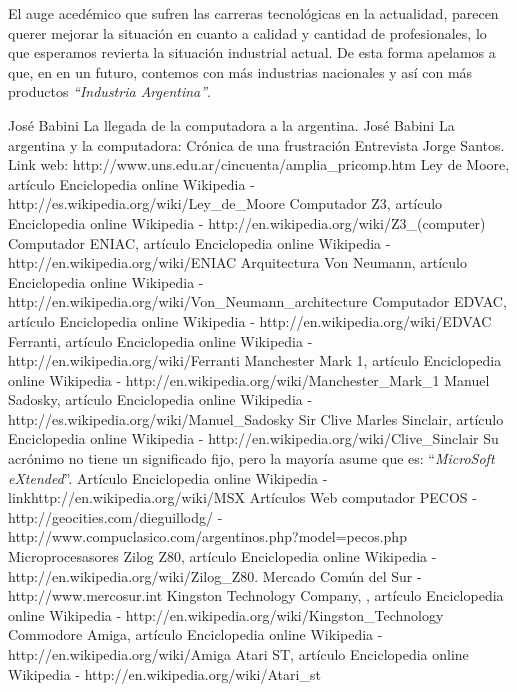 \documentclass[%
 	final,
%
	notitlepage,
	narroweqnarray,
	inline,
 	twoside,
	]{ieee}
\newcommand{\link}[1]{\textit{}{#1}}
\begin{document}
El auge aced\'emico que sufren las carreras tecnol\'ogicas en la actualidad, parecen querer mejorar la situaci\'on en cuanto a calidad y cantidad de profesionales, lo que esperamos revierta la situaci\'on industrial actual. De esta forma apelamos a que, en en un futuro, contemos con m\'as industrias nacionales y as\'i con m\'as productos \textit{``Industria Argentina''}.



\begin{thebibliography}{1}

 Jos\'e Babini La llegada de la computadora a la argentina.
 Jos\'e Babini La argentina y la computadora: Cr\'onica de una frustraci\'on
 Entrevista Jorge Santos.
 Link web: \link{http://www.uns.edu.ar/cincuenta/amplia\_pricomp.htm}
 Ley de Moore, art\'iculo Enciclopedia online Wikipedia -\link{http://es.wikipedia.org/wiki/Ley\_de\_Moore}
 Computador Z3, art\'iculo Enciclopedia online Wikipedia - \link{http://en.wikipedia.org/wiki/Z3\_(computer)}
 Computador ENIAC, art\'iculo Enciclopedia online Wikipedia - \link{http://en.wikipedia.org/wiki/ENIAC}
 Arquitectura Von Neumann, art\'iculo Enciclopedia online Wikipedia - \link{http://en.wikipedia.org/wiki/Von\_Neumann\_architecture}
 Computador EDVAC, art\'iculo Enciclopedia online Wikipedia - \link{http://en.wikipedia.org/wiki/EDVAC}
 Ferranti, art\'iculo Enciclopedia online Wikipedia - \link{http://en.wikipedia.org/wiki/Ferranti}
 Manchester Mark 1, art\'iculo Enciclopedia online Wikipedia - \link{http://en.wikipedia.org/wiki/Manchester\_Mark\_1}
 Manuel Sadosky, art\'iculo Enciclopedia online Wikipedia - \link{http://es.wikipedia.org/wiki/Manuel\_Sadosky}
 Sir Clive Marles Sinclair, art\'iculo Enciclopedia online Wikipedia - \link{http://en.wikipedia.org/wiki/Clive\_Sinclair}
 Su acr\'onimo no tiene un significado fijo, pero la mayor\'ia asume que es: ``\textit{MicroSoft eXtended}''. Art\'iculo Enciclopedia online Wikipedia - link{http://en.wikipedia.org/wiki/MSX}
 Art\'iculos Web computador PECOS - \link{http://geocities.com/dieguillodg/} - \link{http://www.compuclasico.com/argentinos.php?model=pecos.php}
 Microprocesasores Zilog Z80, art\'iculo Enciclopedia online Wikipedia - \link{http://en.wikipedia.org/wiki/Zilog\_Z80}.
 Mercado Com\'un del Sur - \link{http://www.mercosur.int}
 Kingston Technology Company, , art\'iculo Enciclopedia online Wikipedia - \link{http://en.wikipedia.org/wiki/Kingston\_Technology}
 Commodore Amiga, art\'iculo Enciclopedia online Wikipedia - \link{http://en.wikipedia.org/wiki/Amiga}
 Atari ST, art\'iculo Enciclopedia online Wikipedia - \link{http://en.wikipedia.org/wiki/Atari\_st}
 



\end{thebibliography}
\end{document}
